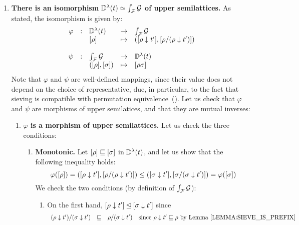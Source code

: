 \begin{enumerate}
\item {\bf There is an isomorphism $\mathbb{D}^{\lambda}(t) \simeq \int_{\mathcal{F}}{\mathcal{G}}$ of upper semilattices.}
  As stated, the isomorphism is given by:
  \[
  \begin{array}{rclcl}
    \varphi & : & \mathbb{D}^{\lambda}(t)        & \to     & \int_{\mathcal{F}}{\mathcal{G}} \\
               &&    {[\rho]} & \mapsto & ({[\rho \downarrow t']}, {[\rho/(\rho \downarrow t')]}) \\
  \\
    \psi    & : & \int_{\mathcal{F}}{\mathcal{G}} & \to & \mathbb{D}^{\lambda}(t) \\
               &&  ({[\rho]},{[\sigma]}) & \mapsto & [\rho\sigma] \\
  \end{array}
  \]
  Note that $\varphi$ and $\psi$ are well-defined mappings, since their value does not
  depend on the choice of representative, due, in particular, to the fact that sieving
  is compatible with permutation equivalence~().
  Let us check that $\varphi$ and $\psi$ are morphisms of upper semilatices,
  and that they are mutual inverses:
  \begin{enumerate}
  \item {\bf $\varphi$ is a morphism of upper semilattices.}
    Let us check the three conditions:
    \begin{enumerate}
    \item {\bf Monotonic.}
      Let ${[\rho]} \sqsubseteq {[\sigma]}$ in $\mathbb{D}^{\lambda}(t)$,
      and let us show that the following inequality holds:
      \[
        \varphi({[\rho]}) =
        ({[\rho \downarrow t']}, {[\rho/(\rho \downarrow t')]})
        \leq
        ({[\sigma \downarrow t']}, {[\sigma/(\sigma \downarrow t')]})
        = \varphi({[\sigma]})
      \]
      We check the two conditions (by definition of $\int_{\mathcal{F}}{\mathcal{G}}$):
      \begin{enumerate}
      \item On the first hand,
            ${[\rho \downarrow t']} \unlhd {[\sigma\downarrow t']}$
            since
            \[
              \begin{array}{rcll}
              (\redseq \sieve \tm')/(\redseqtwo \sieve \tm')
              & \permle &
              \redseq/(\redseqtwo \sieve \tm') & \text{since $\redseq \sieve \tm' \permle \redseq$ by \rlem{sieve_is_prefix}} \\

\end{array}\]
\end{enumerate}
\end{enumerate}
\end{enumerate}
\end{enumerate}
